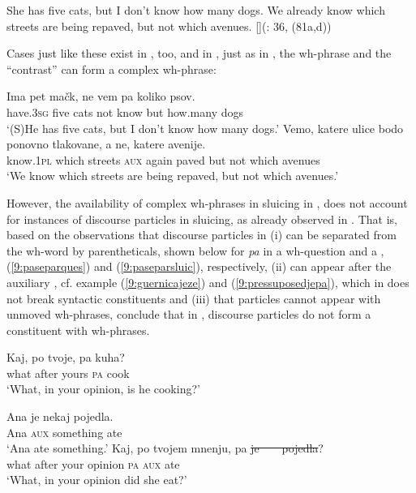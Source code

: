 \documentclass[output=paper,modfonts,newtxmath,hidelinks]{langscibook}
\begin{document}
\begin{exe}
\ex \begin{xlist}
\ex She has five cats, but I don't know how many dogs.
\ex	We already know which streets are being repaved, but not which avenues.\vspace{-6pt}
\exi{}[]{\hfill(\citealt{merchant2001}: 36, (81a,d))}
\end{xlist}
\end{exe}

\noindent Cases just like these exist in , too, and in , just as in , the wh-phrase and the ``contrast'' can form a complex wh-phrase: 

\begin{exe}
\ex \begin{xlist}
\ex \gll Ima pet mačk, ne vem pa koliko psov.\\
have.\textsc{3sg} five cats not know but how.many dogs\\
\trans `(S)He has five cats, but I don't know how many dogs.'
\ex \gll	Vemo, katere ulice bodo ponovno tlakovane, a ne, katere avenije. \\
		know.\textsc{1pl} which streets \textsc{aux} 	again paved but not which avenues \\
\trans `We know which streets are being repaved, but not which avenues.'
\end{xlist}\end{exe}

\noindent However, the availability of complex wh-phrases in sluicing in , does not account for instances of discourse particles in sluicing, as already observed in \cite{marusicetal2015}. That is, based on the observations that discourse particles in  (i) can be separated from the wh-word by parentheticals, shown below for \textit{pa} in a wh-question and a , (\ref{9:paseparques}) and (\ref{9:paseparsluic}), respectively, (ii) can appear after the auxiliary , cf. example (\ref{9:guernicajeze}) and (\ref{9:pressuposedjepa}), which in  does not break syntactic constituents and (iii) that particles cannot appear with unmoved wh-phrases, \cite{marusicetal2015} conclude that in , discourse particles do not form a constituent with wh-phrases. 

\begin{exe}
\ex \label{9:paseparques}
\gll Kaj, po tvoje, pa kuha?\\
	what after yours \textsc{pa} cook\\
\trans  `What, in your opinion, is he cooking?'
\ex \begin{xlist}
\ex \label{9:paseparsluic}
\gll 	Ana je nekaj pojedla. \\
 		Ana \textsc{aux} something ate\\
 \trans  `Ana ate something.'
\ex \gll Kaj, po tvojem mnenju, pa \sout{je}\sout{\ }\sout{\ }\sout{\ }\sout{\ }\sout{pojedla}?\\
 		what after your opinion \textsc{pa} {\textsc{aux} ate}\\
\trans `What, in your opinion did she eat?'
\end{xlist}\end{exe}
 
\end{document}
